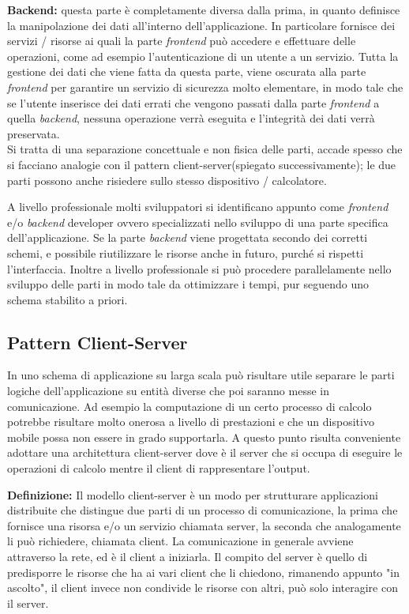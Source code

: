 \textbf{Backend:} questa parte è completamente diversa dalla prima, in quanto definisce la manipolazione dei dati all'interno dell'applicazione. In particolare fornisce dei servizi / risorse ai quali la parte \emph{frontend} può accedere e effettuare delle operazioni, come ad esempio l'autenticazione di un utente a un servizio. Tutta la gestione dei dati che viene fatta da questa parte, viene oscurata alla parte \emph{frontend} per garantire un servizio di sicurezza molto elementare, in modo tale che se l'utente inserisce dei dati errati che vengono passati dalla parte \emph{frontend} a quella \emph{backend}, nessuna operazione verrà eseguita e l'integrità dei dati verrà preservata.\\

Si tratta di una separazione concettuale e non fisica delle parti, accade spesso che si facciano analogie con il pattern client-server(spiegato successivamente); le due parti possono anche risiedere sullo stesso dispositivo / calcolatore.

A livello professionale molti sviluppatori si identificano appunto come \emph{frontend} e/o \emph{backend} developer ovvero specializzati nello sviluppo di una parte specifica dell'applicazione. Se la parte \emph{backend} viene progettata secondo dei corretti schemi, e possibile riutilizzare le risorse anche in futuro, purché si rispetti l'interfaccia. Inoltre a livello professionale si può procedere parallelamente nello sviluppo delle parti in modo tale da ottimizzare i tempi, pur seguendo uno schema stabilito a priori.\\

\subsection{Pattern Client-Server}
\label{subsec:Client-Server}

In uno schema di applicazione su larga scala può risultare utile separare le parti logiche dell'applicazione su entità diverse che poi saranno messe in comunicazione. Ad esempio la computazione di un certo processo di calcolo potrebbe risultare molto onerosa a livello di prestazioni e che un dispositivo mobile possa non essere in grado supportarla. A questo punto risulta conveniente adottare una architettura client-server dove è il server che si occupa di eseguire le operazioni di calcolo mentre il client di rappresentare l'output. 

\textbf{Definizione:} Il modello client-server è un modo per strutturare applicazioni distribuite che distingue due parti di un processo di comunicazione, la prima che fornisce una risorsa e/o un servizio chiamata server, la seconda che analogamente li può richiedere, chiamata client. La comunicazione in generale avviene attraverso la rete, ed è il client a iniziarla. Il compito del server è quello di predisporre le risorse che ha ai vari client che li chiedono, rimanendo appunto "in ascolto", il client invece non condivide le risorse con altri, può solo interagire con il server\cite{wiki:cliserv}.\\


